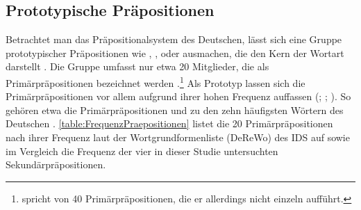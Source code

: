 \subsection{Prototypische Präpositionen} \label{sec:Primaer}
Betrachtet man das Präpositionalsystem des Deutschen, lässt sich eine Gruppe prototypischer Präpositionen wie , , oder  ausmachen, die den Kern der Wortart darstellt \citep[s.][214]{DiMeola2011}. 
Die Gruppe umfasst nur etwa 20 Mitglieder, die als Primärpräpositionen bezeichnet werden \citep[s.][94]{Szczepaniak2011}.\footnote{\citet[146]{Buscha1984} spricht von 40 Primärpräpositionen, die er allerdings nicht einzeln aufführt.}  
Als Prototyp lassen sich die Primärpräpositionen vor allem aufgrund ihrer hohen Frequenz auffassen (\citealp[s.][631]{Griehaber2009}; \citealp[94]{Szczepaniak2011}; \citealp[§896]{Duden2016}).
So gehören etwa die Primärpräpositionen  und  zu den zehn häufigsten Wörtern des Deutschen \citep[s.][]{InstitutfurDeutscheSprache2012}. 
\autoref{table:FrequenzPraepositionen} listet die 20 Primärpräpositionen nach ihrer Frequenz laut der Wortgrundformenliste (DeReWo) des IDS auf sowie im Vergleich die Frequenz der vier in dieser Studie untersuchten Sekundärpräpositionen.
